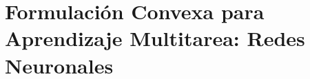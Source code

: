 \documentclass[aspectratio=43,spanish]{beamer}
\newcommand{\fmaxn}[1]{\textbf{#1}}
\newcommand{\fmod}[1]{\textsf{#1}}
\begin{document}
  

  


  \section{Formulación Convexa para Aprendizaje Multitarea: Redes Neuronales}
\end{document}
